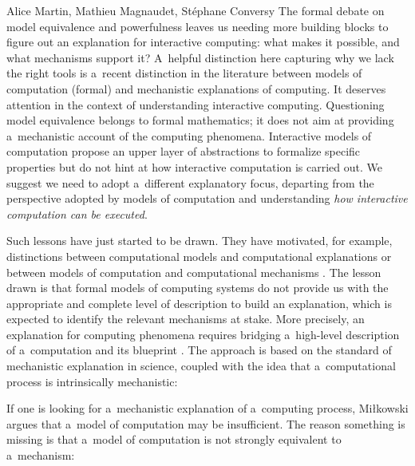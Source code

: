 \begin{artengenv2auth}{Alice Martin, Mathieu Magnaudet, Stéphane Conversy}
The formal debate on model equivalence and powerfulness leaves us needing more building blocks to figure out an explanation for interactive computing: what makes it possible, and what mechanisms support it? A~helpful distinction here capturing why we lack the right tools is a~recent distinction in the literature between models of computation (formal) and mechanistic explanations of computing. It deserves attention in the context of understanding interactive computing. Questioning model equivalence belongs to formal mathematics; it does not aim at providing a~mechanistic account of the computing phenomena. Interactive models of computation propose an upper layer of abstractions to formalize specific properties but do not hint at how interactive computation is carried out. We suggest we need to adopt a~different explanatory focus, departing from the perspective adopted by models of computation and understanding \textit{how interactive computation can be executed}. 

Such lessons have just started to be drawn. They have motivated, for example, distinctions between computational models and computational explanations \parencite{Klein2020} or between models of computation and computational mechanisms \parencite{Mikowski2014}. The lesson drawn is that formal models of computing systems do not provide us with the appropriate and complete level of description to build an explanation, which is expected to identify the relevant mechanisms at stake. More precisely, an explanation for computing phenomena requires bridging a~high-level description of a~computation and its blueprint \parencite{Mikowski2011, Mikowski2016}.
The approach is based on the standard of mechanistic explanation in science, coupled with the idea that a~computational process is intrinsically mechanistic: 


If one is looking for a~mechanistic explanation of a~computing process, Miłkowski argues that a~model of computation may be insufficient. The reason something is missing is that a~model of computation is not strongly equivalent to a~mechanism: 


\end{artengenv2auth}
